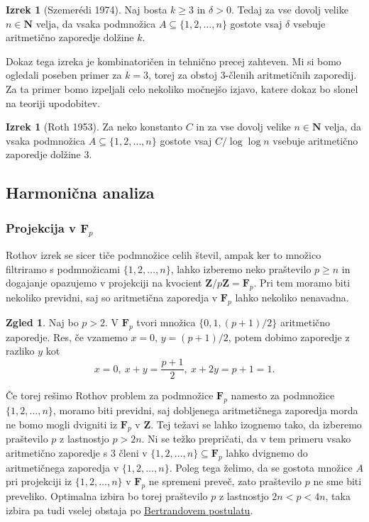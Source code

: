\documentclass[11pt]{book}
\def\NN{\mathbf{N}}
\def\ZZ{\mathbf{Z}}
\def\FF{\mathbf{F}}
\theoremstyle{definition}
\theoremstyle{zgled}
\newtheorem{zgled}[theorem]{Zgled}
\theoremstyle{zgledbrezstevilke}
\theoremstyle{odprtproblem}
\theoremstyle{domacanaloga}
\theoremstyle{izrek}
\newtheorem{izrek}[theorem]{Izrek}
\begin{document}
\begin{izrek}[Szemerédi 1974]
Naj bosta $k \geq 3$ in $\delta > 0$. Tedaj za vse dovolj velike $n \in \NN$ velja, da vsaka podmnožica $A \subseteq \{ 1, 2, \dots, n \}$ gostote vsaj $\delta$ vsebuje aritmetično zaporedje dolžine $k$.
\end{izrek}

Dokaz tega izreka je kombinatoričen in tehnično precej zahteven. Mi si bomo ogledali poseben primer za $k = 3$, torej za obstoj $3$-členih aritmetičnih zaporedij. Za ta primer bomo izpeljali celo nekoliko močnejšo izjavo, katere dokaz bo slonel na teoriji upodobitev.

\begin{izrek}[Roth 1953]
Za neko konstanto $C$ in za vse dovolj velike $n \in \NN$ velja, da vsaka podmnožica $A \subseteq \{ 1, 2, \dots, n \}$ gostote vsaj $C/\log \log n$ vsebuje aritmetično zaporedje dolžine $3$.
\end{izrek}

\subsection{Harmonična analiza}

\subsubsection{Projekcija v $\FF_p$}

Rothov izrek se sicer tiče podmnožice celih števil, ampak ker to množico filtriramo s podmnožicami $\{1,2,\dots,n\}$, lahko izberemo neko praštevilo $p \geq n$ in dogajanje opazujemo v projekciji na kvocient $\ZZ/p\ZZ = \FF_p$. Pri tem moramo biti nekoliko previdni, saj so aritmetična zaporedja v $\FF_p$ lahko nekoliko nenavadna.

\begin{zgled}
Naj bo $p > 2$. V $\FF_p$ tvori množica $\{ 0, 1, (p+1)/2 \}$ aritmetično zaporedje. Res, če vzamemo $x = 0$, $y = (p+1)/2$, potem dobimo zaporedje z razliko $y$ kot
\[
    x = 0, \ x + y = \frac{p+1}{2}, \ x + 2y = p + 1 = 1.
\]
\end{zgled}

Če torej rešimo Rothov problem za podmnožice $\FF_p$ namesto za podmnožice $\{1,2,\dots,n\}$, moramo biti previdni, saj dobljenega aritmetičnega zaporedja morda ne bomo mogli dvigniti iz $\FF_p$ v $\ZZ$. Tej težavi se lahko izognemo tako, da izberemo praštevilo $p$ z lastnostjo $p > 2n$. Ni se težko prepričati, da v tem primeru vsako aritmetično zaporedje s $3$ členi v $\{ 1, 2, \dots, n \} \subseteq \FF_p$ lahko dvignemo do aritmetičnega zaporedja v $\{1,2,\dots,n\}$. Poleg tega želimo, da se gostota množice $A$ pri projekciji iz $\{1,2,\dots,n \}$ v $\FF_p$ ne spremeni preveč, zato praštevilo $p$ ne sme biti preveliko. Optimalna izbira bo torej praštevilo $p$ z lastnostjo $2n < p < 4n$, taka izbira pa tudi vselej obstaja po \href{https://sl.wikipedia.org/wiki/Bertrandova_domneva}{Bertrandovem postulatu}.
\end{document}
